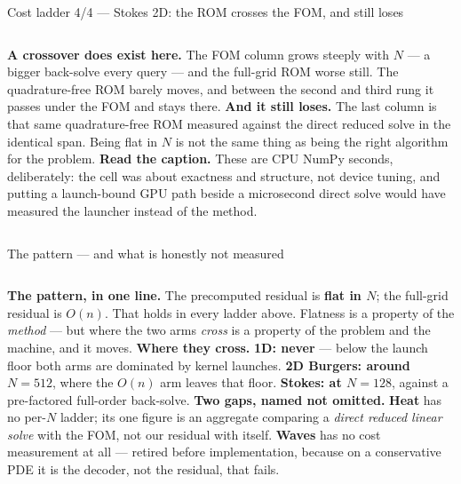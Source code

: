 \documentclass[10pt,aspectratio=169]{beamer}
\begin{document}
\begin{frame}{Cost ladder 4/4 --- Stokes 2D: the ROM crosses the FOM, and still loses}
  \centering\scriptsize
  

  \vspace{3mm}
  \begin{columns}[T]
    \footnotesize
    \textbf{A crossover does exist here.} The FOM column grows steeply with $N$ --- a bigger
    back-solve every query --- and the full-grid ROM worse still. The quadrature-free ROM barely
    moves, and between the second and third rung it passes under the FOM and stays there.
    \footnotesize
    \textbf{And it still loses.} The last column is that same quadrature-free ROM measured against
    the direct reduced solve in the identical span. Being flat in $N$ is not the same thing as being
    the right algorithm for the problem.
    \footnotesize
    \textbf{Read the caption.} These are CPU NumPy seconds, deliberately: the cell was about
    exactness and structure, not device tuning, and putting a launch-bound GPU path beside a
    microsecond direct solve would have measured the launcher instead of the method.
  \end{columns}
\end{frame}

\begin{frame}{The pattern --- and what is honestly not measured}
  \centering\scriptsize
  \resizebox{\textwidth}{!}{}

  \vspace{3mm}
  \begin{columns}[T]
    \footnotesize
    \textbf{The pattern, in one line.} The precomputed residual is \textbf{flat in $N$}; the
    full-grid residual is \textbf{$O(n)$}. That holds in every ladder above. Flatness is a property
    of the \emph{method} --- but where the two arms \emph{cross} is a property of the problem and
    the machine, and it moves.
    \footnotesize
    \textbf{Where they cross.}
    \textbf{1D: never} --- below the launch floor both arms are dominated by kernel launches.
    \textbf{2D Burgers: around $N=512$}, where the $O(n)$ arm leaves that floor.
    \textbf{Stokes: at $N=128$}, against a pre-factored full-order back-solve.
    \footnotesize
    \textbf{Two gaps, named not omitted.} \textbf{Heat} has no per-$N$ ladder; its one figure is an
    aggregate comparing a \emph{direct reduced linear solve} with the FOM, not our residual with
    itself. \textbf{Waves} has no cost measurement at all --- retired before implementation, because
    on a conservative PDE it is the decoder, not the residual, that fails.
  \end{columns}
\end{frame}
\end{document}

